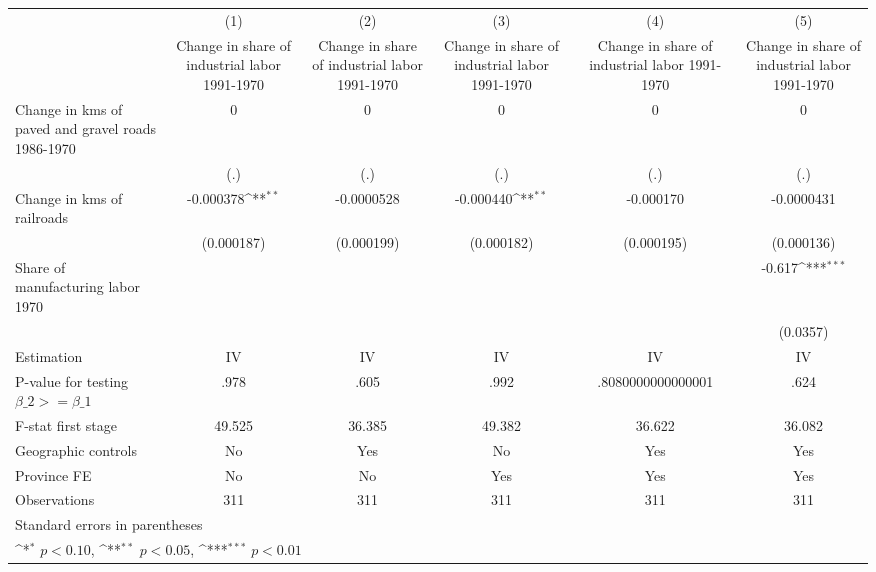 {
\def\sym#1{\ifmmode^{#1}\else\(^{#1}\)\fi}
\begin{tabular}{l*{5}{c}}
\hline\hline
                    &\multicolumn{1}{c}{(1)}&\multicolumn{1}{c}{(2)}&\multicolumn{1}{c}{(3)}&\multicolumn{1}{c}{(4)}&\multicolumn{1}{c}{(5)}\\
                    &\multicolumn{1}{c}{Change in share of industrial labor 1991-1970}&\multicolumn{1}{c}{Change in share of industrial labor 1991-1970}&\multicolumn{1}{c}{Change in share of industrial labor 1991-1970}&\multicolumn{1}{c}{Change in share of industrial labor 1991-1970}&\multicolumn{1}{c}{Change in share of industrial labor 1991-1970}\\
\hline
Change in kms of paved and gravel roads 1986-1970&           0         &           0         &           0         &           0         &           0         \\
                    &         (.)         &         (.)         &         (.)         &         (.)         &         (.)         \\
[1em]
Change in kms of railroads&   -0.000378\sym{**} &  -0.0000528         &   -0.000440\sym{**} &   -0.000170         &  -0.0000431         \\
                    &  (0.000187)         &  (0.000199)         &  (0.000182)         &  (0.000195)         &  (0.000136)         \\
[1em]
Share of manufacturing labor 1970&                     &                     &                     &                     &      -0.617\sym{***}\\
                    &                     &                     &                     &                     &    (0.0357)         \\
\hline
Estimation          &          IV         &          IV         &          IV         &          IV         &          IV         \\
P-value for testing $\beta\_2 >= \beta\_1$&        .978         &        .605         &        .992         &.8080000000000001         &        .624         \\
F-stat first stage  &      49.525         &      36.385         &      49.382         &      36.622         &      36.082         \\
Geographic controls &          No         &         Yes         &          No         &         Yes         &         Yes         \\
Province FE         &          No         &          No         &         Yes         &         Yes         &         Yes         \\
Observations        &         311         &         311         &         311         &         311         &         311         \\
\hline\hline
\multicolumn{6}{l}{\footnotesize Standard errors in parentheses}\\
\multicolumn{6}{l}{\footnotesize \sym{*} \(p<0.10\), \sym{**} \(p<0.05\), \sym{***} \(p<0.01\)}\\
\end{tabular}
}
